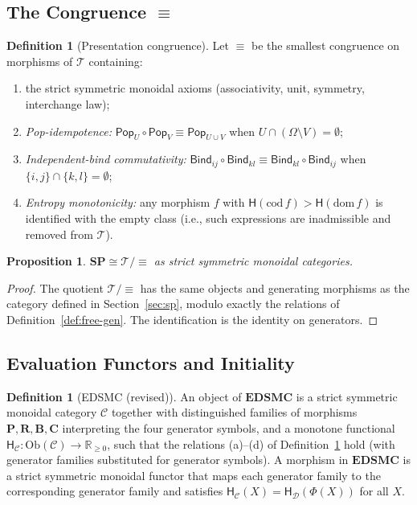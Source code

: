 \documentclass[12pt,a4paper]{article}
\newtheorem{proposition}[theorem]{Proposition}
\theoremstyle{definition}
\newtheorem{definition}[theorem]{Definition}
\theoremstyle{remark}
\newcommand{\Rnn}{\mathbb{R}_{\ge 0}}
\newcommand{\Ent}{\ensuremath{\mathsf{H}}}
\newcommand{\SP}{\mathbf{SP}}
\newcommand{\EDSMC}{\mathbf{EDSMC}}
\newcommand{\Ob}{\mathrm{Ob}}
\begin{document}
\subsection{The Congruence \texorpdfstring{$\equiv$}{≡}}

\begin{definition}[Presentation congruence]
\label{def:congruence}
Let $\equiv$ be the smallest congruence on morphisms of $\mathcal{T}$ containing:
\begin{enumerate}[label=(\alph*)]
  \item the strict symmetric monoidal axioms (associativity, unit, symmetry,
    interchange law);
  \item \emph{Pop-idempotence:}
    $\mathsf{Pop}_U\circ\mathsf{Pop}_V\equiv\mathsf{Pop}_{U\cup V}$
    when $U\cap(\Omega\setminus V)=\emptyset$;
  \item \emph{Independent-bind commutativity:}
    $\mathsf{Bind}_{ij}\circ\mathsf{Bind}_{kl}\equiv
    \mathsf{Bind}_{kl}\circ\mathsf{Bind}_{ij}$ when $\{i,j\}\cap\{k,l\}=\emptyset$;
  \item \emph{Entropy monotonicity:} any morphism $f$ with $\Ent(\mathrm{cod}\,f)>
    \Ent(\mathrm{dom}\,f)$ is identified with the empty class (i.e., such expressions
    are inadmissible and removed from $\mathcal{T}$).
\end{enumerate}
\end{definition}

\begin{proposition}
$\SP\cong\mathcal{T}/{\equiv}$ as strict symmetric monoidal categories.
\end{proposition}

\begin{proof}
The quotient $\mathcal{T}/{\equiv}$ has the same objects and generating morphisms
as the category defined in Section~\ref{sec:sp}, modulo exactly the relations of
Definition~\ref{def:free-gen}. The identification is the identity on generators.
\end{proof}

\subsection{Evaluation Functors and Initiality}

\begin{definition}[EDSMC (revised)]
\label{def:edsmc-revised}
An object of $\EDSMC$ is a strict symmetric monoidal category $\mathcal{C}$ together
with distinguished families of morphisms
$\mathbf{P},\mathbf{R},\mathbf{B},\mathbf{C}$ interpreting the four generator
symbols, and a monotone functional $\Ent_\mathcal{C}:\Ob(\mathcal{C})\to\Rnn$,
such that the relations (a)--(d) of Definition~\ref{def:congruence} hold
(with generator families substituted for generator symbols). A morphism in
$\EDSMC$ is a strict symmetric monoidal functor that maps each generator family
to the corresponding generator family and satisfies
$\Ent_\mathcal{C}(X)=\Ent_{\mathcal{D}}(\Phi(X))$ for all $X$.
\end{definition}
\end{document}
